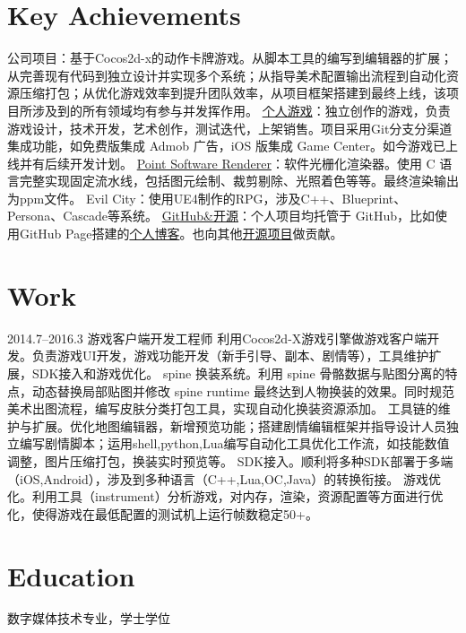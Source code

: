 \documentclass[full]{rvca_print}
\begin{document}
\section{Key Achievements}

\achievements
{公司项目：基于Cocos2d-x的动作卡牌游戏。从脚本工具的编写到编辑器的扩展；从完善现有代码到独立设计并实现多个系统；从指导美术配置输出流程到自动化资源压缩打包；从优化游戏效率到提升团队效率，从项目框架搭建到最终上线，该项目所涉及到的所有领域均有参与并发挥作用。}
{\href{http://a.app.qq.com/o/simple.jsp?pkgname=com.kode.Thirteen}{个人游戏}：独立创作的游戏，负责游戏设计，技术开发，艺术创作，测试迭代，上架销售。项目采用Git分支分渠道集成功能，如免费版集成 Admob 广告，iOS 版集成 Game Center。如今游戏已上线并有后续开发计划。}
{\href{https://github.com/keyring/point}{Point Software Renderer}：软件光栅化渲染器。使用 C 语言完整实现固定流水线，包括图元绘制、裁剪剔除、光照着色等等。最终渲染输出为ppm文件。}
{Evil City：使用UE4制作的RPG，涉及C++、Blueprint、Persona、Cascade等系统。}
{\href{http://github.com/keyring}{GitHub\&开源}：个人项目均托管于 GitHub，比如使用GitHub Page搭建的\href{http://www.photoneray.com}{个人博客}。也向其他\href{https://github.com/cloudwu/lua53doc/graphs/contributors}{开源项目}做贡献。}
{}

\section{Work}


{2014.7--2016.3}%
{游戏客户端开发工程师} %
{利用Cocos2d-X游戏引擎做游戏客户端开发。负责游戏UI开发，游戏功能开发（新手引导、副本、剧情等），工具维护扩展，SDK接入和游戏优化。}%
{spine 换装系统。利用 spine 骨骼数据与贴图分离的特点，动态替换局部贴图并修改 spine runtime 最终达到人物换装的效果。同时规范美术出图流程，编写皮肤分类打包工具，实现自动化换装资源添加。}
{工具链的维护与扩展。优化地图编辑器，新增预览功能；搭建剧情编辑框架并指导设计人员独立编写剧情脚本；运用shell,python,Lua编写自动化工具优化工作流，如技能数值调整，图片压缩打包，换装实时预览等。}
{SDK接入。顺利将多种SDK部署于多端（iOS,Android），涉及到多种语言（C++,Lua,OC,Java）的转换衔接。}
{游戏优化。利用工具（instrument）分析游戏，对内存，渲染，资源配置等方面进行优化，使得游戏在最低配置的测试机上运行帧数稳定50+。}
{}

\section{Education}

数字媒体技术专业，学士学位
\end{document}

